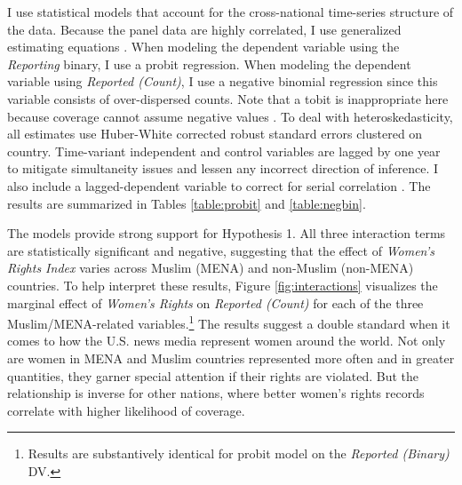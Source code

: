 \documentclass[11pt, oneside]{article}
\begin{document}
I use statistical models that account for the cross-national time-series structure of the data. Because the panel data are highly correlated, I use generalized estimating equations \cite{zorn2001}. When modeling the dependent variable using the \emph{Reporting} binary, I use a probit regression. When modeling the dependent variable using \emph{Reported (Count)}, I use a negative binomial regression since this variable consists of over-dispersed counts. Note that a tobit is inappropriate here because coverage cannot assume negative values \cite{sigelman1999}. To deal with heteroskedasticity, all estimates use Huber-White corrected robust standard errors clustered on country.  Time-variant independent and control variables are lagged by one year to mitigate simultaneity issues and lessen any incorrect direction of inference. I also include a lagged-dependent variable to correct for serial correlation \cite{wooldridge2010}. The results are summarized in Tables \ref{table:probit} and \ref{table:negbin}.




The models provide strong support for Hypothesis 1. All three interaction terms are statistically significant and negative, suggesting that the effect of \emph{Women's Rights Index} varies across Muslim (MENA) and non-Muslim (non-MENA) countries. To help interpret these results, Figure \ref{fig:interactions} visualizes the marginal effect of \emph{Women's Rights} on \emph{Reported (Count)} for each of the three Muslim/MENA-related variables.\footnote{\hspace{5}Results are substantively identical for probit model on the \emph{Reported (Binary)} DV.} The results suggest a double standard when it comes to how the U.S. news media represent women around the world. Not only are women in MENA and Muslim countries represented more often and in greater quantities, they garner special attention if their rights are violated. But the relationship is inverse for other nations, where better women's rights records correlate with higher likelihood of coverage. 
\end{document}

